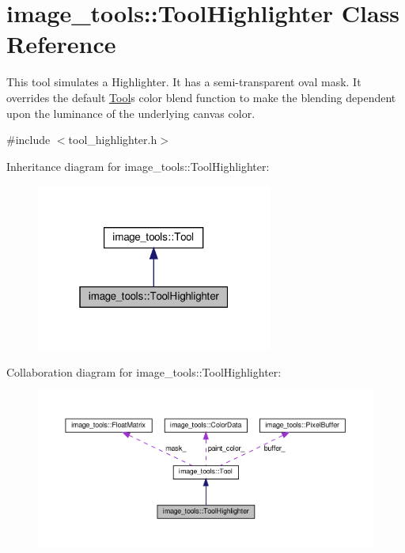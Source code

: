 \hypertarget{classimage__tools_1_1ToolHighlighter}{}\section{image\+\_\+tools\+:\+:Tool\+Highlighter Class Reference}
\label{classimage__tools_1_1ToolHighlighter}


This tool simulates a Highlighter. It has a semi-\/transparent oval mask. It overrides the default \hyperlink{classimage__tools_1_1Tool}{Tool}\textquotesingle{}s color blend function to make the blending dependent upon the luminance of the underlying canvas color.  




{\ttfamily \#include $<$tool\+\_\+highlighter.\+h$>$}



Inheritance diagram for image\+\_\+tools\+:\+:Tool\+Highlighter\+:
\nopagebreak
\begin{figure}[H]
\begin{center}
\leavevmode
\includegraphics[width=220pt]{classimage__tools_1_1ToolHighlighter__inherit__graph}
\end{center}
\end{figure}


Collaboration diagram for image\+\_\+tools\+:\+:Tool\+Highlighter\+:
\nopagebreak
\begin{figure}[H]
\begin{center}
\leavevmode
\includegraphics[width=350pt]{classimage__tools_1_1ToolHighlighter__coll__graph}
\end{center}
\end{figure}
